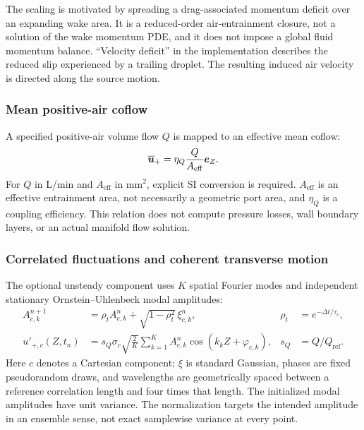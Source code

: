 The scaling is motivated by spreading a drag-associated momentum deficit over an expanding wake area. It is a reduced-order air-entrainment closure, not a solution of the wake momentum PDE, and it does not impose a global fluid momentum balance. ``Velocity deficit'' in the implementation describes the reduced slip experienced by a trailing droplet. The resulting induced air velocity is directed along the source motion.

\subsubsection{Mean positive-air coflow}
A specified positive-air volume flow $Q$ is mapped to an effective mean coflow:
\begin{equation}
 \overline{\boldsymbol{u}}_+=\eta_Q\frac{Q}{A_{\mathrm{eff}}}\boldsymbol{e}_Z.
\label{eq:positive_air}
\end{equation}
For $Q$ in L/min and $A_{\mathrm{eff}}$ in mm$^2$, explicit SI conversion is required. $A_{\mathrm{eff}}$ is an effective entrainment area, not necessarily a geometric port area, and $\eta_Q$ is a coupling efficiency. This relation does not compute pressure losses, wall boundary layers, or an actual manifold flow solution.

\subsubsection{Correlated fluctuations and coherent transverse motion}
The optional unsteady component uses $K$ spatial Fourier modes and independent stationary Ornstein--Uhlenbeck modal amplitudes:
\begin{align}
 A_{c,k}^{n+1}&=\rho_t A_{c,k}^n+\sqrt{1-\rho_t^2}\,\xi_{c,k}^n,
 &\rho_t&=e^{-\Delta t/\tau_c},\\
 u'_{+,c}(Z,t_n)&=s_Q\sigma_c\sqrt{\frac{2}{K}}
 \sum_{k=1}^{K} A_{c,k}^n\cos(k_k Z+\varphi_{c,k}),
 &s_Q&=Q/Q_{\mathrm{ref}}.
\label{eq:ou}
\end{align}
Here $c$ denotes a Cartesian component; $\xi$ is standard Gaussian, phases are fixed pseudorandom draws, and wavelengths are geometrically spaced between a reference correlation length and four times that length. The initialized modal amplitudes have unit variance. The normalization targets the intended amplitude in an ensemble sense, not exact samplewise variance at every point.


